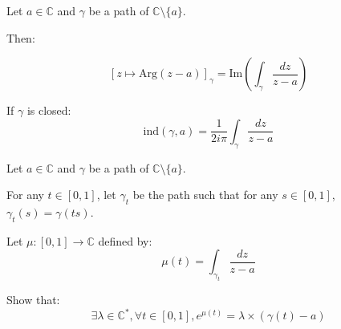\begin{thm*}
    Let $a\in\mathbb{C}$ and $\gamma$ be a path of $\mathbb{C} \setminus \lbrace a \rbrace$.

    Then:

    $$ [z \mapsto \mathrm{Arg}(z - a)]_\gamma = \mathrm{Im}\left(\int_\gamma \frac{dz}{z-a}\right)$$

    If $\gamma$ is closed:
    $$\boxed{\mathrm{ind}(\gamma, a) = \frac{1}{2i\pi}\int_\gamma\frac{dz}{z-a}}$$
\end{thm*}

\begin{exo}
    Let $a\in\mathbb{C}$ and $\gamma$ be a path of $\mathbb{C} \setminus \lbrace a \rbrace$.

    For any $t\in[0,1]$, let $\gamma_t$ be the path such that for any $s\in[0,1]$, $\gamma_t(s) = \gamma(ts)$. 

    Let $\mu : [0,1] \rightarrow \mathbb{C}$ defined by:
    $$ \mu(t) = \int_{\gamma_t} \frac{dz}{z-a}$$ 

    Show that:
    $$\exists \lambda\in\mathbb{C}^*, \forall t \in [0,1], e^{\mu(t)} = \lambda \times (\gamma(t) -a) $$
\end{exo}

